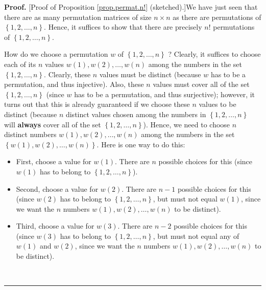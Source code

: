 \documentclass[numbers=enddot,12pt,final,onecolumn,notitlepage]{scrartcl}%
\theoremstyle{definition}
\newenvironment{proof}[1][Proof]{\noindent\textbf{#1.} }{\ \rule{0.5em}{0.5em}}
\begin{document}
\begin{proof}
[Proof of Proposition \ref{prop.permat.n!} (sketched).]We have just seen that
there are as many permutation matrices of size $n\times n$ as there are
permutations of $\left\{  1,2,\ldots,n\right\}  $. Hence, it suffices to show
that there are precisely $n!$ permutations of $\left\{  1,2,\ldots,n\right\}
$.

How do we choose a permutation $w$ of $\left\{  1,2,\ldots,n\right\}  $ ?
Clearly, it suffices to choose each of its $n$ values $w\left(  1\right)
,w\left(  2\right)  ,\ldots,w\left(  n\right)  $ among the numbers in the set
$\left\{  1,2,\ldots,n\right\}  $. Clearly, these $n$ values must be distinct
(because $w$ has to be a permutation, and thus injective). Also, these $n$
values must cover all of the set $\left\{  1,2,\ldots,n\right\}  $ (since $w$
has to be a permutation, and thus surjective); however, it turns out that this
is already guaranteed if we choose these $n$ values to be distinct (because
$n$ distinct values chosen among the numbers in $\left\{  1,2,\ldots
,n\right\}  $ will \textbf{always} cover all of the set $\left\{
1,2,\ldots,n\right\}  $). Hence, we need to choose $n$ distinct numbers
$w\left(  1\right)  ,w\left(  2\right)  ,\ldots,w\left(  n\right)  $ among the
numbers in the set $\left\{  w\left(  1\right)  ,w\left(  2\right)
,\ldots,w\left(  n\right)  \right\}  $. Here is one way to do this:

\begin{itemize}
\item First, choose a value for $w\left(  1\right)  $. There are $n$ possible
choices for this (since $w\left(  1\right)  $ has to belong to $\left\{
1,2,\ldots,n\right\}  $).

\item Second, choose a value for $w\left(  2\right)  $. There are $n-1$
possible choices for this (since $w\left(  2\right)  $ has to belong to
$\left\{  1,2,\ldots,n\right\}  $, but must not equal $w\left(  1\right)  $,
since we want the $n$ numbers $w\left(  1\right)  ,w\left(  2\right)
,\ldots,w\left(  n\right)  $ to be distinct).

\item Third, choose a value for $w\left(  3\right)  $. There are $n-2$
possible choices for this (since $w\left(  3\right)  $ has to belong to
$\left\{  1,2,\ldots,n\right\}  $, but must not equal any of $w\left(
1\right)  $ and $w\left(  2\right)  $, since we want the $n$ numbers $w\left(
1\right)  ,w\left(  2\right)  ,\ldots,w\left(  n\right)  $ to be distinct).


\end{itemize}
\end{proof}
\end{document}
